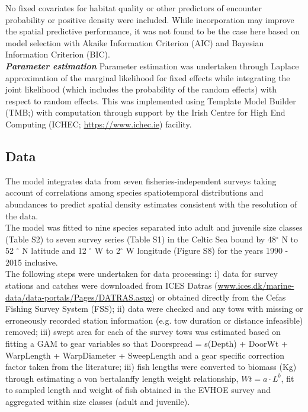 \documentclass[fleqn,10pt]{wlscirep}
\begin{document}
\begin{linenumbers}
No fixed covariates for habitat quality or other predictors of encounter
probability or positive density were included. While incorporation may improve
the spatial predictive performance\cite{Thorson2017}, it was not found to be
the case here based on model selection with Akaike Information Criterion (AIC)
and Bayesian Information Criterion (BIC).\\

\textbf{\textit{Parameter estimation}} Parameter estimation was undertaken
through Laplace approximation of the marginal likelihood for fixed effects
while integrating the joint likelihood (which includes the probability of the
random effects) with respect to random effects. This was implemented using
Template Model Builder (TMB;\cite{Kristensen2015}) with computation through
support by the Irish Centre for High End Computing (ICHEC;
\url{https://www.ichec.ie}) facility.  \\

\subsection*{Data\\}

The model integrates data from seven fisheries-independent surveys taking
account of correlations among species spatiotemporal distributions and
abundances to predict spatial density estimates consistent with the resolution
of the data. \\

The model was fitted to nine species separated into adult and juvenile size
classes (Table S2) to seven survey series (Table S1) in the Celtic Sea bound by
48$^{\circ}$ N to 52 $^{\circ}$ N latitude and 12 $^{\circ}$ W to 2$^{\circ}$ W
longitude (Figure S8) for the years 1990 - 2015 inclusive. \\

The following steps were undertaken for data processing: i) data for survey
stations and catches were downloaded from ICES Datras
(\url{www.ices.dk/marine-data/data-portals/Pages/DATRAS.aspx}) or obtained
directly from the Cefas Fishing Survey System (FSS); ii) data were checked and
any tows with missing or erroneously recorded station information (e.g. tow
duration or distance infeasible) removed; iii) swept area for each of the
survey tows was estimated based on fitting a GAM to gear variables so that
Doorspread = s(Depth) + DoorWt + WarpLength + WarpDiameter + SweepLength and a
gear specific correction factor taken from the literature\cite{Piet2009}; iii)
fish lengths were converted to biomass (Kg) through estimating a von
bertalanffy length weight relationship, $Wt = a \cdot L^{b}$, fit to sampled
length and weight of fish obtained in the EVHOE survey and aggregated within
size classes (adult and juvenile).  \\


\end{linenumbers}
\end{document}
